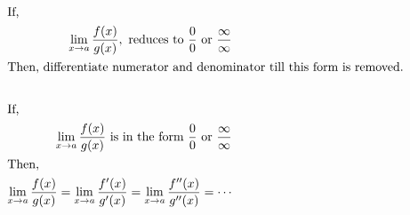 \large
\ttfamily
{}

\begin{align*}
\intertext{If,}
\lim_{x\to a}\dfrac{f(x)}{g(x)}, \text{ reduces to } \dfrac{0}{0} \text{ or } \dfrac{\infty}{\infty}\\
\intertext{Then, differentiate numerator and denominator till this form is removed.}\\
    \intertext{If,}
    \lim_{x\to a}\dfrac{f(x)}{g(x)} \text{ is in the form } \dfrac{0}{0} \text{ or } \dfrac{\infty}{\infty} \\
    \intertext{Then,}
\lim_{x\to a}\dfrac{f(x)}{g(x)} = \lim_{x\to a}\dfrac{f'(x)}{g'(x)} = \lim_{x\to a}\dfrac{f''(x)}{g''(x)} = \cdots
\end{align*}

